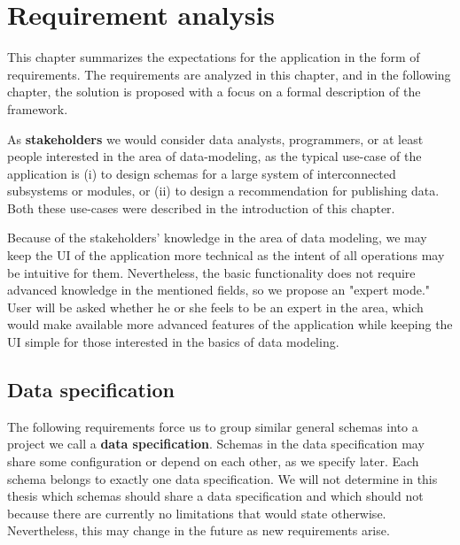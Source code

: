 \chapter{Requirement analysis}\label{chapters:analysis}

This chapter summarizes the expectations for the application in the form of requirements. The requirements are analyzed in this chapter, and in the following chapter, the solution is proposed with a focus on a formal description of the framework.

\bigskip

As \textbf{stakeholders} we would consider data analysts, programmers, or at least people interested in the area of data-modeling, as the typical use-case of the application is (i) to design schemas for a large system of interconnected subsystems or modules, or (ii) to design a recommendation for publishing data. Both these use-cases were described in the introduction of this chapter.

Because of the stakeholders' knowledge in the area of data modeling, we may keep the UI of the application more technical as the intent of all operations may be intuitive for them. Nevertheless, the basic functionality does not require advanced knowledge in the mentioned fields, so we propose an "expert mode." User will be asked whether he or she feels to be an expert in the area, which would make available more advanced features of the application while keeping the UI simple for those interested in the basics of data modeling.

\bigskip






\bigskip





\section{Data specification}

The following requirements force us to group similar general schemas into a project we call a \textbf{data specification}. Schemas in the data specification may share some configuration or depend on each other, as we specify later. Each schema belongs to exactly one data specification. We will not determine in this thesis which schemas should share a data specification and which should not because there are currently no limitations that would state otherwise. Nevertheless, this may change in the future as new requirements arise.

